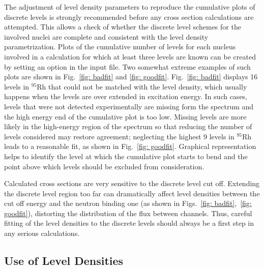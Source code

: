 The adjustment of level density parameters
to reproduce the cumulative plots of discrete
levels is strongly recommended before any cross section calculations are
attempted. This allows a check of whether the discrete level schemes for the
involved nuclei are complete and consistent with the level density
parametrization. Plots of the cumulative number of levels for each nucleus
involved in a calculation for which at least three levels are known can
be created by setting an option in the input file. Two somewhat extreme
examples of such plots are shown in Fig.~\ref{fig: badfit} and \ref{fig:
goodfit}. Fig.~\ref{fig: badfit} displays 16 levels in $^{95}$Rh that
could not be matched with the level density, which usually happens when
the levels are over extended in excitation energy.
In such cases, levels that were not detected
experimentally are missing form the spectrum and the high energy
end of the cumulative plot is too low. Missing levels are more likely in the
high-energy region of the spectrum so that reducing the number of levels
considered may restore agreement; neglecting the highest 9 levels in
$^{95}$Rh leads to a reasonable fit, as shown in Fig.~\ref{fig: goodfit}.
Graphical representation helps to identify the level at which the cumulative
plot starts to bend and the point above which levels should be excluded
from consideration.

Calculated cross sections are very sensitive to the discrete level cut off.
Extending the discrete level region too far can dramatically affect level
densities between the cut off energy and the neutron binding one
(as shown in Figs.~\ref{fig: badfit},~\ref{fig: goodfit}),
distorting the distribution of the flux
between channels. Thus, careful fitting of the level densities to the
discrete levels should always be a first step in any serious calculations.

\subsection{Use of Level Densities}

